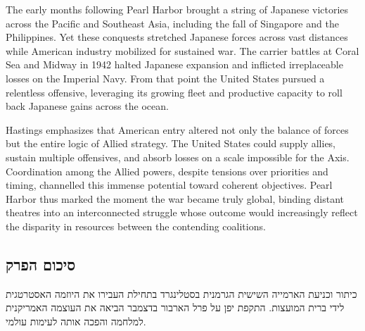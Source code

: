 The early months following Pearl Harbor brought a string of Japanese victories across the Pacific and Southeast Asia, including the fall of Singapore and the Philippines. Yet these conquests stretched Japanese forces across vast distances while American industry mobilized for sustained war. The carrier battles at Coral Sea and Midway in 1942 halted Japanese expansion and inflicted irreplaceable losses on the Imperial Navy. From that point the United States pursued a relentless offensive, leveraging its growing fleet and productive capacity to roll back Japanese gains across the ocean.

Hastings emphasizes that American entry altered not only the balance of forces but the entire logic of Allied strategy. The United States could supply allies, sustain multiple offensives, and absorb losses on a scale impossible for the Axis. Coordination among the Allied powers, despite tensions over priorities and timing, channelled this immense potential toward coherent objectives. Pearl Harbor thus marked the moment the war became truly global, binding distant theatres into an interconnected struggle whose outcome would increasingly reflect the disparity in resources between the contending coalitions. \cite{hastings2011} \cite{weinberg1994} \cite{beevor2012}

\bigskip
\begin{otherlanguage}{hebrew}
\subsection*{סיכום הפרק}

כיתור וכניעת הארמייה השישית הגרמנית בסטלינגרד בתחילת {\endL} העבירו את היוזמה האסטרטגית לידי ברית המועצות. התקפת יפן על פרל הארבור בדצמבר {\endL} הביאה את העוצמה האמריקנית למלחמה והפכה אותה לעימות עולמי.

\end{otherlanguage}

\clearpage
